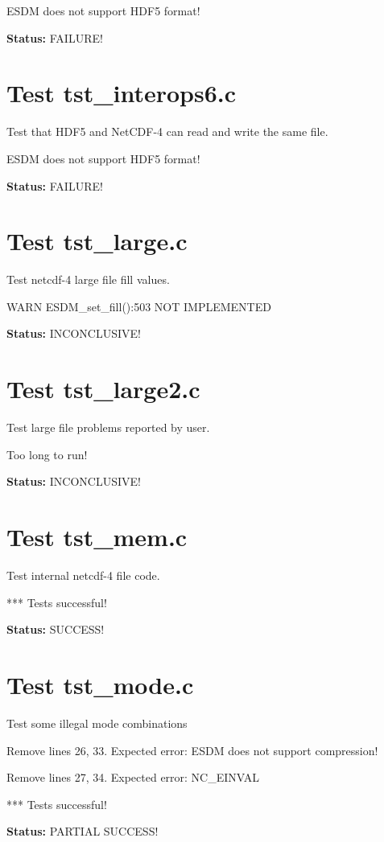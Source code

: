 ESDM does not support HDF5 format!

{\bf \large Status: } FAILURE!

\section{Test tst\_interops6.c}

Test that HDF5 and NetCDF-4 can read and write the same file.

ESDM does not support HDF5 format!

{\bf \large Status: } FAILURE!

\section{Test tst\_large.c}

Test netcdf-4 large file fill values.

WARN ESDM\_set\_fill():503 NOT IMPLEMENTED

{\bf \large Status: } INCONCLUSIVE!

\section{Test tst\_large2.c}

Test large file problems reported by user.

Too long to run!

{\bf \large Status: } INCONCLUSIVE!

\section{Test tst\_mem.c}

Test internal netcdf-4 file code.

*** Tests successful!

{\bf \large Status: } SUCCESS!

\section{Test tst\_mode.c}

Test some illegal mode combinations

Remove lines 26, 33. Expected error: ESDM does not support compression!

Remove lines 27, 34. Expected error: NC\_EINVAL

*** Tests successful!

{\bf \large Status: } PARTIAL SUCCESS!

